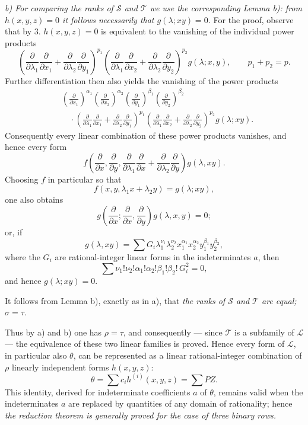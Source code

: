 \documentclass[11pt]{article}
\begin{document}
\emph{b) For comparing the ranks of $\mathcal S$ and $\mathcal T$ we use the corresponding Lemma b): from $h(x,y,z)=0$ it follows necessarily that $g(\lambda;xy)=0$.} For the proof, observe that by 3. $h(x,y,z)=0$ is equivalent to the vanishing of the individual power products
\[
 \left(\frac{\partial}{\partial\lambda_1}\frac{\partial}{\partial x_1}
 +\frac{\partial}{\partial\lambda_2}\frac{\partial}{\partial y_1}\right)^{p_1}
 \left(\frac{\partial}{\partial\lambda_1}\frac{\partial}{\partial x_2}
 +\frac{\partial}{\partial\lambda_2}\frac{\partial}{\partial y_2}\right)^{p_2}g(\lambda;x,y),
 \qquad p_1+p_2=p.
\]
Further differentiation then also yields the vanishing of the power products
\[
\begin{aligned}
&\left(\frac{\partial}{\partial x_1}\right)^{\alpha_1}
 \left(\frac{\partial}{\partial x_2}\right)^{\alpha_2}
 \left(\frac{\partial}{\partial y_1}\right)^{\beta_1}
 \left(\frac{\partial}{\partial y_2}\right)^{\beta_2} \\
&\quad\cdot
 \left(\frac{\partial}{\partial\lambda_1}\frac{\partial}{\partial x_1}
 +\frac{\partial}{\partial\lambda_2}\frac{\partial}{\partial y_1}\right)^{p_1}
 \left(\frac{\partial}{\partial\lambda_1}\frac{\partial}{\partial x_2}
 +\frac{\partial}{\partial\lambda_2}\frac{\partial}{\partial y_2}\right)^{p_2}
 g(\lambda;xy).
\end{aligned}
\]
Consequently every linear combination of these power products vanishes, and hence every form
\[
  f\left(\frac{\partial}{\partial x},\frac{\partial}{\partial y},
  \frac{\partial}{\partial\lambda_1}\frac{\partial}{\partial x}
  +\frac{\partial}{\partial\lambda_2}\frac{\partial}{\partial y}\right)g(\lambda,xy).
\]
Choosing $f$ in particular so that
\[
  f(x,y,\lambda_1x+\lambda_2y)=g(\lambda;xy),
\]
one also obtains
\[
  g\left(\frac{\partial}{\partial x};
    \frac{\partial}{\partial x},
    \frac{\partial}{\partial y}\right)g(\lambda,x,y)=0;
\]
or, if
\[
  g(\lambda,xy)=\sum G_i\lambda_1^{\nu_1}\lambda_2^{\nu_2}
  x_1^{\alpha_1}x_2^{\alpha_2}y_1^{\beta_1}y_2^{\beta_2},
\]
where the $G_i$ are rational-integer linear forms in the indeterminates $a$, then
\[
  \sum \nu_1!\nu_2!\alpha_1!\alpha_2!\beta_1!\beta_2!\,G_i^2=0,
\]
and hence $g(\lambda;xy)=0$.

It follows from Lemma b), exactly as in a), that \emph{the ranks of $\mathcal S$ and $\mathcal T$ are equal; $\sigma=\tau$.}

Thus by a) and b) one has $\rho=\tau$, and consequently --- since $\mathcal T$ is a subfamily of $\mathcal L$ --- the equivalence of these two linear families is proved. Hence every form of $\mathcal L$, in particular also $\theta$, can be represented as a linear rational-integer combination of $\rho$ linearly independent forms $h(x,y,z)$:
\[
  \theta=\sum c_i h^{(i)}(x,y,z)=\sum PZ.
\]
This identity, derived for indeterminate coefficients $a$ of $\theta$, remains valid when the indeterminates $a$ are replaced by quantities of any domain of rationality; hence \emph{the reduction theorem is generally proved for the case of three binary rows.}
\end{document}
